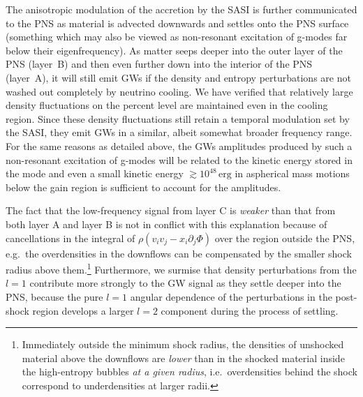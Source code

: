 The anisotropic modulation of the accretion by the SASI is further
communicated to the PNS as material is advected downwards and settles
onto the PNS surface (something which may also be viewed as
non-resonant excitation of g-modes far below their
eigenfrequency). As matter seeps deeper into the outer layer of the PNS (layer~B) and
then even further down into the interior of the PNS (layer~A), it will still
emit GWs if the density and entropy perturbations are
not washed out completely by neutrino cooling. We have verified that
relatively large density fluctuations on the percent level are maintained
even in the cooling region. Since these density fluctuations still
retain a temporal modulation set by the SASI, they emit GWs in a similar, albeit somewhat broader frequency range. For the
same reasons as detailed above, the GWs amplitudes produced by
such a non-resonant excitation of g-modes will be related to
the kinetic energy stored in the mode and even a small kinetic
energy $\gtrsim 10^{48}  \, \mathrm{erg}$ in aspherical
mass motions below the gain region is sufficient to account
for the amplitudes.

The fact that the low-frequency signal from layer C
is \emph{weaker} than that from both layer A and layer B
is not in conflict with this explanation
because of cancellations in
the integral of $ \rho \left ( v_i v_j - x_i \partial_j \Phi \right) $
over the region outside the PNS, e.g.\ the overdensities in
the downflows can be compensated by the smaller shock radius
above them.\footnote{Immediately outside the minimum shock radius, the densities
of unshocked material above the downflows are \emph{lower} than in the shocked
material inside the high-entropy bubbles \emph{at a given radius}, i.e.\ overdensities
behind the shock correspond to underdensities at larger radii.}
Furthermore, we surmise that
density perturbations from the $l=1$ contribute more strongly to
the GW signal as they settle deeper into the PNS, because the pure
$l=1$ angular dependence of the perturbations in the post-shock
region develops a larger $l=2$ component during the process of settling.

